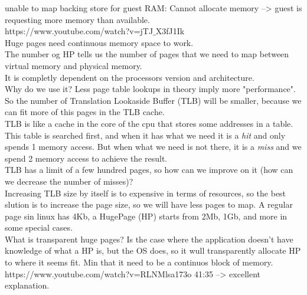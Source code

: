 \documentclass[11pt, a4paper, oneside]{article}
\theoremstyle{definition}
\begin{document}
unable to map backing store for guest RAM: Cannot allocate memory --> guest is requesting more memory than available. \\

https://www.youtube.com/watch?v=jTJ$\_$X3fJ1Ik\\
Huge pages need continuous memory space to work.\\
The number og HP tells us the number of pages that we need to map between virtual memory and physical memory.\\
It is completly dependent on the processors version and architecture.\\
Why do we use it? Less page table lookups in theory imply more "performance". So the number of Translation Lookaside Buffer (TLB) will be smaller, because we can fit more of this pages in the TLB cache. \\
TLB is like a cache in the core of the cpu that stores some addresses in a table. This table is searched first, and when it has what we need it is a \textit{hit} and only spends 1 memory access. But when what we need is not there, it is a \textit{miss} and we spend 2 memory access to achieve the result. \\
TLB has a limit of a few hundred pages, so how can we improve on it (how can we decrease the number of misses)?\\
Increasing TLB size by itself is to expensive in terms of resources, so the best slution is to increase the page size, so we will have less pages to map. A regular page sin linux has 4Kb, a HugePage (HP) starts from 2Mb, 1Gb, and more in some special cases.\\

What is transparent huge pages? Is the case where the application doesn't have knowledge of what a HP is, but the OS does, so it wull transparently allocate HP to where it seems fit. Min that it need to be a continuos block of memory.\\
https://www.youtube.com/watch?v=RLNMlsa173o 41:35 --> excellent explanation.\\

\end{document}

